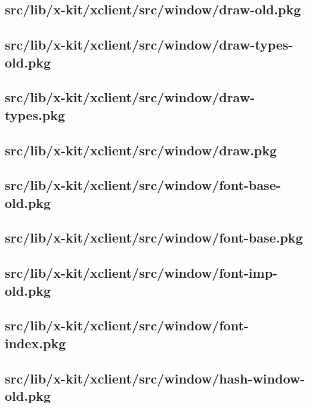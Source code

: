 \subsection{src/lib/x-kit/xclient/src/window/draw-old.pkg}


\subsection{src/lib/x-kit/xclient/src/window/draw-types-old.pkg}


\subsection{src/lib/x-kit/xclient/src/window/draw-types.pkg}


\subsection{src/lib/x-kit/xclient/src/window/draw.pkg}


\subsection{src/lib/x-kit/xclient/src/window/font-base-old.pkg}


\subsection{src/lib/x-kit/xclient/src/window/font-base.pkg}


\subsection{src/lib/x-kit/xclient/src/window/font-imp-old.pkg}


\subsection{src/lib/x-kit/xclient/src/window/font-index.pkg}


\subsection{src/lib/x-kit/xclient/src/window/hash-window-old.pkg}


